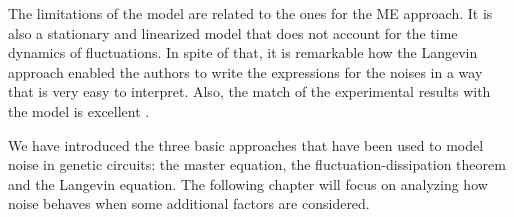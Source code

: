 The limitations of the model are related to the ones for the ME approach. It is also a stationary and linearized model that does not account for the time dynamics of fluctuations. In spite of that, it is remarkable how the Langevin approach enabled the authors to write the expressions for the noises in a way that is very easy to interpret. Also, the match of the experimental results with the model is excellent \cite{pedraza05} \cite{pedraza06}.

We have introduced the three basic approaches that have been used to model noise in genetic circuits: the master equation, the fluctuation-dissipation theorem and the Langevin equation. The following chapter will focus on analyzing how noise behaves when some additional factors are considered.
